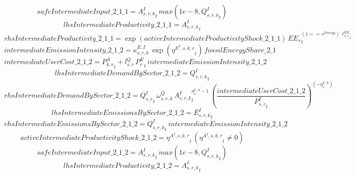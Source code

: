 \begin{dmath*}
safeIntermediateInput\_2\_1\_1 = {{A^{I}_{s,r,k}}}_{t}\, max(1e-8,{{Q^{I}_{s,r,k}}}_{t})
\end{dmath*}
\begin{dmath*}
lhsIntermediateProductivity\_2\_1\_1 = {{A^{I}_{s,r,k}}}_{t}
\end{dmath*}
\begin{dmath*}
rhsIntermediateProductivity\_2\_1\_1 = \exp\left({activeIntermediateProductivityShock\_2\_1\_1}\right)\, {{EE_r}}_{t}^{\left(1=={{s^{Energy}}}\right)\, {{\ell^{EE}_{s,r}}}_{t}}
\end{dmath*}
\begin{dmath*}
intermediateEmissionIntensity\_2\_1\_2 = {{\kappa^{E,I}_{s,r,k}}}\, \exp\left({{\eta^{E^{I},s,k,r}}}_{t}\right)\, {fossilEnergyShare\_2\_1}
\end{dmath*}
\begin{dmath*}
intermediateUserCost\_2\_1\_2 = {{P^{A}_{k,r}}}_{t}+{{l^{Q}_{s,r}}}\, {{P^E_r}}_{t}\, {intermediateEmissionIntensity\_2\_1\_2}
\end{dmath*}
\begin{dmath*}
lhsIntermediateDemandBySector\_2\_1\_2 = {{Q^{I}_{s,r,k}}}_{t}
\end{dmath*}
\begin{dmath*}
rhsIntermediateDemandBySector\_2\_1\_2 = {{Q^{I}_{s,r}}}_{t}\, {{\omega^{Q}_{s,r,k}}}\, {{A^{I}_{s,r,k}}}_{t}^{{{\eta^{I,A}_{s}}}-1}\, \left(\frac{{intermediateUserCost\_2\_1\_2}}{{{P^{I}_{s,r}}}_{t}}\right)^{\left(-{{\eta^{I,A}_{s}}}\right)}
\end{dmath*}
\begin{dmath*}
lhsIntermediateEmissionsBySector\_2\_1\_2 = {{E^I_{s,r,k}}}_{t}
\end{dmath*}
\begin{dmath*}
rhsIntermediateEmissionsBySector\_2\_1\_2 = {{Q^{I}_{s,r,k}}}_{t}\, {intermediateEmissionIntensity\_2\_1\_2}
\end{dmath*}
\begin{dmath*}
activeIntermediateProductivityShock\_2\_1\_2 = {{\eta^{A^{I},s,k,r}}}_{t}\, \left({{\eta^{A^{I},s,k,r}}}_{t}\neq 0\right)
\end{dmath*}
\begin{dmath*}
safeIntermediateInput\_2\_1\_2 = {{A^{I}_{s,r,k}}}_{t}\, max(1e-8,{{Q^{I}_{s,r,k}}}_{t})
\end{dmath*}
\begin{dmath*}
lhsIntermediateProductivity\_2\_1\_2 = {{A^{I}_{s,r,k}}}_{t}
\end{dmath*}
